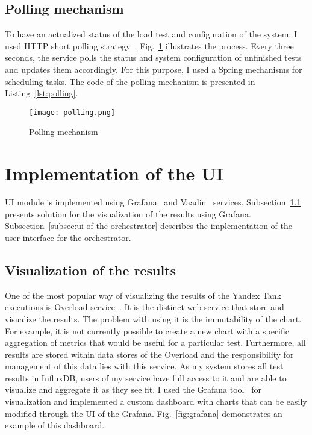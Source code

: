 \subsection{Polling mechanism}\label{subsec:polling_mechanism}
To have an actualized status of the load test and configuration of the system, I used HTTP short polling strategy~\cite{http}.
Fig.~\ref{fig:polling} illustrates the process. Every three seconds, the service polls the status and system configuration of unfinished tests and updates them accordingly.
For this purpose, I used a Spring mechanisms for scheduling tasks. The code of the polling mechanism is presented in Listing~\ref{lst:polling}.
\begin{figure}[t]
    \centering
    \texttt{[image: polling.png]}
    \caption{Polling mechanism}
    \label{fig:polling}
\end{figure}

\begin{flushright}
\begin{minipage}{\textwidth}
    
\end{minipage}
\end{flushright}


\section{Implementation of the UI}\label{sec:implementation-of-ui}
UI module is implemented using Grafana~\cite{grafana} and Vaadin~\cite{vaadin} services.
Subsection~\ref{subsec:visualization-of-the-results} presents solution for the visualization of the results using Grafana.
Subsection~\ref{subsec:ui-of-the-orchestrator} describes the implementation of the user interface for the orchestrator.

\subsection{Visualization of the results}\label{subsec:visualization-of-the-results}
One of the most popular way of visualizing the results of the Yandex Tank executions is Overload service~\cite{overload}. It is the distinct web service that store and visualize the results. The problem with using it is the immutability of the chart.
For example, it is not currently possible to create a new chart with a specific aggregation of metrics that would be useful for a particular test. Furthermore, all results are stored within data stores of the Overload and the responsibility for management of this data lies with this service.
As my system stores all test results in InfluxDB, users of my service have full access to it and are able to visualize and aggregate it as they see fit.
I used the Grafana tool~\cite{grafana} for visualization and implemented a custom dashboard with charts that can be easily modified through the UI of the Grafana. Fig.~\ref{fig:grafana} demonstrates an example of this dashboard.

